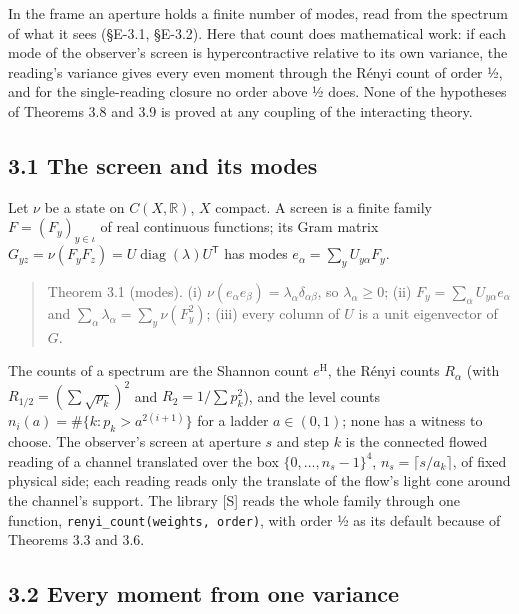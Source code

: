 \documentclass[10pt,letterpaper,twocolumn]{article}
\begin{document}
In the frame an aperture holds a finite number of modes, read from the spectrum of what it sees (§E-3.1, §E-3.2). Here that count does mathematical work: if each mode of the observer's screen is hypercontractive relative to its own variance, the reading's variance gives every even moment through the Rényi count of order ½, and for the single-reading closure no order above ½ does. None of the hypotheses of Theorems 3.8 and 3.9 is proved at any coupling of the interacting theory.

\subsection{3.1 The screen and its modes}\label{31-the-screen-and-its-modes}

Let \(\nu\) be a state on \(C(X,\mathbb R)\), \(X\) compact. A screen is a finite family \(F=(F_y)_{y\in\iota}\) of real continuous functions; its Gram matrix \(G_{yz}=\nu(F_yF_z)=U\operatorname{diag}(\lambda)U^{\mathsf T}\) has modes \(e_\alpha=\sum_yU_{y\alpha}F_y\).

\begin{quote}
Theorem 3.1 (modes). (i) \(\nu(e_\alpha e_\beta)=\lambda_\alpha\delta_{\alpha\beta}\), so \(\lambda_\alpha\ge0\); (ii) \(F_y=\sum_\alpha U_{y\alpha}e_\alpha\) and \(\sum_\alpha\lambda_\alpha=\sum_y\nu(F_y^2)\); (iii) every column of \(U\) is a unit eigenvector of \(G\).
\end{quote}

The counts of a spectrum are the Shannon count \(e^{\mathrm H}\), the Rényi counts \(R_\alpha\) (with \(R_{1/2}=(\sum\sqrt{p_k})^2\) and \(R_2=1/\sum p_k^2\)), and the level counts \(n_i(a)=\#\{k:p_k>a^{2(i+1)}\}\) for a ladder \(a\in(0,1)\); none has a witness to choose. The observer's screen at aperture \(s\) and step \(k\) is the connected flowed reading of a channel translated over the box \(\{0,\dots,n_s-1\}^4\), \(n_s=\lceil s/a_k\rceil\), of fixed physical side; each reading reads only the translate of the flow's light cone around the channel's support. The library {[}S{]} reads the whole family through one function, \texttt{renyi\_\allowbreak{}count(\allowbreak{}weights,\allowbreak{}\ order)\allowbreak{}}, with order ½ as its default because of Theorems 3.3 and 3.6.

\subsection{3.2 Every moment from one variance}\label{32-every-moment-from-one-variance}
\end{document}
